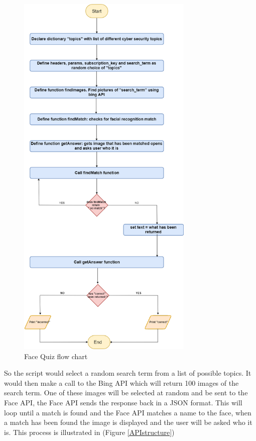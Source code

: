 \documentclass[12pt,a4paper]{article}
\begin{document}
\begin{figure}[h]
    \centering
    \includegraphics[width=0.75\textwidth]{Figs/Face_Quiz (1).png}
    \caption{Face Quiz flow chart} 
    \label{FaceQuiz}
\end{figure}     

So the script would select a random search term from a list of possible topics. It would then make a call to the Bing API which will return 100 images of the search term. One of these images will be selected at random and be sent to the Face API, the Face API sends the response back in a JSON format. This will loop until a match is found and the Face API matches a name to the face, when a match has been found the image is displayed and the user will be asked who it is. This process is illustrated in (Figure \ref{APIstructure})  
\end{document}
